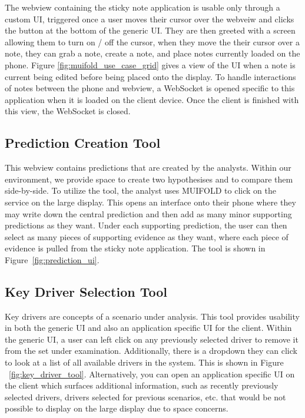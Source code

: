 The webview containing the sticky note application is usable only
through a custom UI, triggered once a user moves their cursor
over the webveiw and clicks the button at the bottom of the generic
UI. They are then greeted with a screen allowing them to turn on / off
the cursor, when they move the their cursor over a note, they can
grab a note, create a note, and place notes currently loaded on the
phone. Figure \ref{fig:muifold_use_case_grid} gives a view of the
UI when a note is current being edited before being placed onto the
display. To handle interactions of notes between the phone and
webview, a WebSocket is opened specific to this application when
it is loaded on the client device. Once the client is finished with
this view, the WebSocket is closed.

\subsection{Prediction Creation Tool}

This webview contains predictions that are created by the analysts. Within our
environment, we provide space to create two hypothesises and to compare them
side-by-side. To utilize the tool, the analyst uses MUIFOLD to click on the
service on the large display. This opens an interface onto their phone where
they may write down the central prediction and then add as many minor supporting
predictions as they want. Under each supporting prediction, the user can then select
as many pieces of supporting evidence as they want, where each piece of evidence is
pulled from the sticky note application. The tool is shown in Figure~\ref{fig:prediction_ui}.

\subsection{Key Driver Selection Tool}

Key drivers are concepts of a scenario under analysis.
This tool provides usability in both the generic UI and also an
application specific UI for the client. Within the generic UI, a user
can left click on any previously selected driver to remove it
from the set under examination. Additionally, there is a dropdown
they can click to look at a list of all available drivers in the
system. This is shown in Figure ~\ref{fig:key_driver_tool}.
Alternatively, you can open an application specific UI on the client
which surfaces additional information, such as recently previously
selected drivers, drivers selected for previous scenarios, etc. that
would be not possible to display on the large display due to space
concerns.

